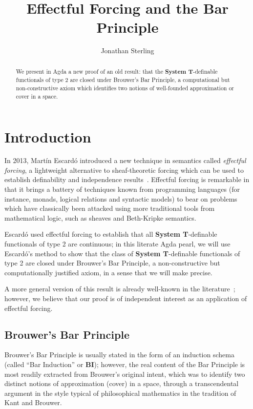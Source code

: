 \documentclass[runningheads,a4paper]{llncs}[2015/06/24]
\newcommand\SystemT{\textbf{System T}}
\newcommand\BI{\textbf{BI}}
\begin{document}
\title{Effectful Forcing and the Bar Principle}

\author{Jonathan Sterling }

\maketitle

\begin{abstract}
  We present in Agda a new proof of an old result: that the
  \SystemT{}-definable functionals of type 2 are closed under
  Brouwer's Bar Principle, a computational but non-constructive axiom
  which identifies two notions of well-founded approximation or cover
  in a space.
\end{abstract}

\section{Introduction}

In 2013, Mart\'in Escard\'o introduced a new technique in semantics
called \emph{effectful forcing}, a lightweight alternative to
sheaf-theoretic forcing which can be used to establish definability
and independence results~\cite{escardo:2013}. Effectful forcing is
remarkable in that it brings a battery of techniques known from
programming languages (for instance, monads, logical relations and
syntactic models) to bear on problems which have classically been
attacked using more traditional tools from mathematical logic, such as
sheaves and Beth-Kripke semantics.

Escard\'o used effectful forcing to establish that all
\SystemT{}-definable functionals of type 2 are continuous; in this
literate Agda pearl, we will use Escard\'o's method to show that the
class of \SystemT{}-definable functionals of type 2 are closed under
Brouwer's Bar Principle, a non-constructive but computationally
justified axiom, in a sense that we will make precise.

A more general version of this result is already well-known in the
literature~\cite{schwichtenberg:1979,oliva-steila:2016}; however, we
believe that our proof is of independent interest as an application of
effectful forcing.

\subsection{Brouwer's Bar Principle}

Brouwer's Bar Principle is usually stated in the form of an induction
schema (called ``Bar Induction'' or \BI{}); however, the real content
of the Bar Principle is most readily extracted from Brouwer's original
intent, which was to identify two distinct notions of approximation
(cover) in a space, through a transcendental argument in the style
typical of philosophical mathematics in the tradition of Kant and
Brouwer.
\end{document}
